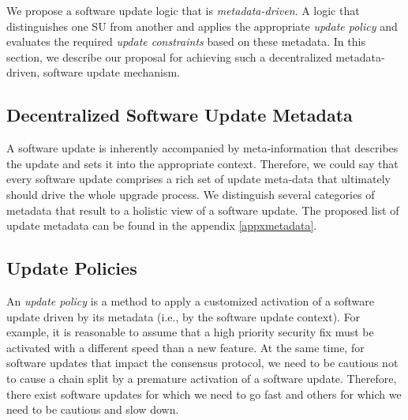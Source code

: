 We propose a software update logic that is \emph{metadata-driven}. A logic that distinguishes one SU from another and applies the appropriate \emph{update policy} and evaluates the required \emph{update constraints} based on these metadata. 
In this section, we describe our proposal for achieving such a decentralized metadata-driven, software update mechanism.

\subsection{Decentralized Software Update Metadata} 
A software update is inherently accompanied by meta-information that describes the update and sets it into the appropriate context. Therefore, we could say that every software update comprises a rich set of update meta-data that ultimately should drive the whole upgrade process. We distinguish several categories of metadata that result to a holistic view of a software update. The proposed list of update metadata can be found in the appendix \ref{appxmetadata}. 

\subsection{Update Policies} 

An \emph{update policy} is a method to apply a customized activation of a software update driven by its metadata (i.e., by the software update context). For example, it is reasonable to assume that a high priority security fix must be activated with a different speed than a  new feature. At the same time, for software updates that impact the consensus protocol, we need to be cautious not to cause a chain split by a premature activation of a software update. Therefore, there exist software updates for which we need to go fast and others for which we need to be cautious and slow down.


